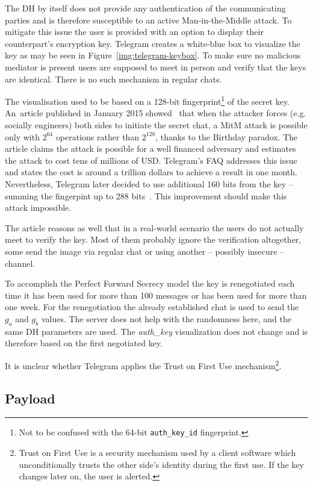 \documentclass[thesis=M,english]{FITthesis}[2012/10/20]
\begin{document}
The DH by itself does not provide any authentication of the communicating parties and is therefore susceptible to an active Man-in-the-Middle attack. To mitigate this issue the user is provided with an option to display their counterpart's encryption key. Telegram creates a white-blue box to visualize the key as may be seen in Figure~\ref{img:telegram-keybox}. To make sure no malicious mediator is present users are supposed to meet in person and verify that the keys are identical. There is no such mechanism in regular chats.

The visualisation used to be based on a 128-bit fingerprint\footnote{Not to be confused with the 64-bit \texttt{auth\_key\_id} fingerprint.} of the secret key. An~article published in January 2015 showed~\cite{telegram-264} that when the attacker forces (e.g. socially engineers) both sides to initiate the secret chat, a MitM attack is possible only with $2^{64}$ operations rather than $2^{128}$, thanks to the Birthday paradox. The article claims the attack is possible for a well financed adversary and estimates the attack to cost tens of millions of USD. Telegram's FAQ addresses this issue and states the cost is around a trillion dollars to achieve a result in one month. Nevertheless, Telegram later decided to use additional 160 bits from the key -- summing the fingerpint up to 288 bits~\cite{telegram-techfaq}. This improvement should make this attack impossible.

The article reasons as well that in a real-world scenario the users do not actually meet to verify the key. Most of them probably ignore the verification altogether, some send the image via regular chat or using another -- possibly insecure -- channel.

To accomplish the Perfect Forward Secrecy model the key is renegotiated each time it has been used for more than 100 messages or has been used for more than one week. For the renegotiation the already established chat is used to send the $g_a$ and $g_b$ values. The server does not help with the randomness here, and the same DH parameters are used. The \emph{auth\_key} visualization does not change and is therefore based on the first negotiated key.

It is unclear whether Telegram applies the Trust on First Use mechanism\footnote{Trust on First Use is a security mechanism used by a client software which unconditionally trusts the other side's identity during the first use. If the key changes later on, the user is alerted.}.


\subsection{Payload}
\end{document}
